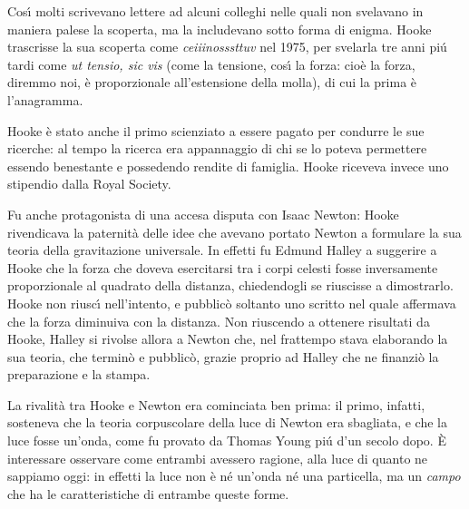 \documentclass[12pt, a4paper]{physathome}   	%
\begin{document}
Cos\'\i{} molti scrivevano lettere ad alcuni colleghi nelle quali non svelavano in maniera palese la scoperta, ma la includevano sotto forma di enigma. Hooke trascrisse la sua scoperta come {\em ceiiinosssttuv} nel 1975, per svelarla tre anni pi\'u tardi come {\em ut tensio, sic vis} (come la tensione, cos\'\i{} la forza: cio\`e la forza, diremmo noi, \`e proporzionale all'estensione della molla), di cui la prima \`e l'anagramma.

Hooke \`e stato anche il primo scienziato a essere pagato per condurre le sue ricerche: al tempo la ricerca era appannaggio di chi se lo poteva permettere essendo benestante e possedendo rendite di famiglia. Hooke riceveva invece uno stipendio dalla Royal Society.

Fu anche protagonista di una accesa disputa con Isaac Newton: Hooke rivendicava la paternit\`a delle idee che avevano portato Newton a formulare la sua teoria della gravitazione universale. In effetti fu Edmund Halley a suggerire a Hooke che la forza che doveva esercitarsi tra i corpi celesti fosse inversamente proporzionale al quadrato della distanza, chiedendogli se riuscisse a dimostrarlo. Hooke non riusc\'\i{} nell'intento, e pubblic\`o soltanto uno scritto nel quale affermava che la forza diminuiva con la distanza. Non riuscendo a ottenere risultati da Hooke, Halley si rivolse allora a Newton che, nel frattempo stava elaborando la sua teoria, che termin\`o e pubblic\`o, grazie proprio ad Halley che ne finanzi\`o la preparazione e la stampa.

La rivalit\`a tra Hooke e Newton era cominciata ben prima: il primo, infatti, sosteneva che la teoria corpuscolare della luce di Newton era sbagliata, e che la luce fosse un'onda, come fu provato da Thomas Young pi\'u d'un secolo dopo. \`E interessare osservare come entrambi avessero ragione, alla luce di quanto ne sappiamo oggi: in effetti la luce non \`e n\'e un'onda n\'e una particella, ma un {\em campo} che ha le caratteristiche di entrambe queste forme.
\end{document}
